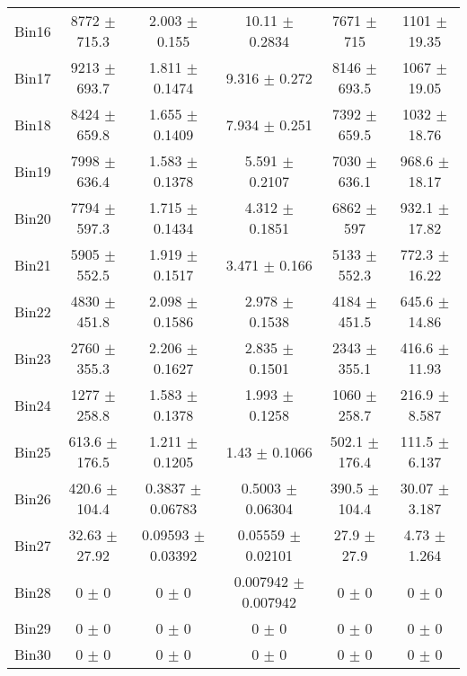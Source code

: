\begin{tabular}{@{\extracolsep{4pt}}lccccc@{}}
     Bin16 & 8772 $\pm$ 715.3 & 2.003 $\pm$ 0.155 & 10.11 $\pm$ 0.2834 & 7671 $\pm$ 715 & 1101 $\pm$ 19.35 \\ 
     Bin17 & 9213 $\pm$ 693.7 & 1.811 $\pm$ 0.1474 & 9.316 $\pm$ 0.272 & 8146 $\pm$ 693.5 & 1067 $\pm$ 19.05 \\ 
     Bin18 & 8424 $\pm$ 659.8 & 1.655 $\pm$ 0.1409 & 7.934 $\pm$ 0.251 & 7392 $\pm$ 659.5 & 1032 $\pm$ 18.76 \\ 
     Bin19 & 7998 $\pm$ 636.4 & 1.583 $\pm$ 0.1378 & 5.591 $\pm$ 0.2107 & 7030 $\pm$ 636.1 & 968.6 $\pm$ 18.17 \\ 
     Bin20 & 7794 $\pm$ 597.3 & 1.715 $\pm$ 0.1434 & 4.312 $\pm$ 0.1851 & 6862 $\pm$ 597 & 932.1 $\pm$ 17.82 \\ 
     Bin21 & 5905 $\pm$ 552.5 & 1.919 $\pm$ 0.1517 & 3.471 $\pm$ 0.166 & 5133 $\pm$ 552.3 & 772.3 $\pm$ 16.22 \\ 
     Bin22 & 4830 $\pm$ 451.8 & 2.098 $\pm$ 0.1586 & 2.978 $\pm$ 0.1538 & 4184 $\pm$ 451.5 & 645.6 $\pm$ 14.86 \\ 
     Bin23 & 2760 $\pm$ 355.3 & 2.206 $\pm$ 0.1627 & 2.835 $\pm$ 0.1501 & 2343 $\pm$ 355.1 & 416.6 $\pm$ 11.93 \\ 
     Bin24 & 1277 $\pm$ 258.8 & 1.583 $\pm$ 0.1378 & 1.993 $\pm$ 0.1258 & 1060 $\pm$ 258.7 & 216.9 $\pm$ 8.587 \\ 
     Bin25 & 613.6 $\pm$ 176.5 & 1.211 $\pm$ 0.1205 & 1.43 $\pm$ 0.1066 & 502.1 $\pm$ 176.4 & 111.5 $\pm$ 6.137 \\ 
     Bin26 & 420.6 $\pm$ 104.4 & 0.3837 $\pm$ 0.06783 & 0.5003 $\pm$ 0.06304 & 390.5 $\pm$ 104.4 & 30.07 $\pm$ 3.187 \\ 
     Bin27 & 32.63 $\pm$ 27.92 & 0.09593 $\pm$ 0.03392 & 0.05559 $\pm$ 0.02101 & 27.9 $\pm$ 27.9 & 4.73 $\pm$ 1.264 \\ 
     Bin28 & 0 $\pm$ 0 & 0 $\pm$ 0 & 0.007942 $\pm$ 0.007942 & 0 $\pm$ 0 & 0 $\pm$ 0 \\ 
     Bin29 & 0 $\pm$ 0 & 0 $\pm$ 0 & 0 $\pm$ 0 & 0 $\pm$ 0 & 0 $\pm$ 0 \\ 
     Bin30 & 0 $\pm$ 0 & 0 $\pm$ 0 & 0 $\pm$ 0 & 0 $\pm$ 0 & 0 $\pm$ 0 \\ 
\hline\hline
  \end{tabular}

